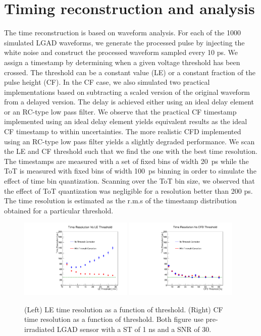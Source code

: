 \documentclass[preprint,1p]{elsarticle}
\begin{document}
\section{Timing reconstruction and analysis}\label{sec:timing_and_analysis}
The time reconstruction is based on waveform analysis. For each of the 1000 simulated LGAD waveforms,
we generate the processed pulse by injecting the white noise and construct the processed waveform
sampled every 10 ps. We assign a timestamp by determining when a given voltage threshold has been crossed.
The threshold can be a constant value (LE) or a constant fraction of the pulse height (CF).
In the CF case, we also simulated two practical implementations based on subtracting
a scaled version of the original waveform from a delayed version. The delay is achieved either using an ideal
delay element or an RC-type low pass filter. We observe that the practical CF timestamp implemented
using an ideal delay element yields equivalent results as the ideal CF timestamp to within uncertainties.
The more realistic CFD implemented using an RC-type low pass filter yields a slightly degraded performance.
We scan the LE and CF threshold such that we find the one with the best time resolution.
The timestamps are measured with a set of fixed bins of width 20~\si{ps} while the ToT is measured with fixed bins of width 100~\si{ps} binning in order to simulate the effect of time bin quantization. Scanning over the ToT bin size, we observed that the effect of ToT quantization was negligible for a resolution better than 200 ps.
The time resolution is estimated as the r.m.s of the timestamp distribution obtained for a particular threshold.

  \begin{figure}[htbp]
    \centering
    \includegraphics[width=0.48\textwidth]{figs/ShapingTime1p0_SNR30_55MicronGain15Prerad_FIXED_NOISE_FIXED_SNR_V2_converted_TimeResolutionVsThresholdToT.pdf} \hfill
    \includegraphics[width=0.48\textwidth]{figs/ShapingTime1p0_SNR30_55MicronGain15Prerad_FIXED_NOISE_FIXED_SNR_V2_converted_TimeResolutionVsThresholdCFD.pdf}
    \caption{(Left) LE time resolution as a function of threshold.
    (Right) CF time resolution as a function of threshold.
    Both figure use pre-irradiated LGAD sensor with a ST of 1 ns and a SNR of 30.}
    \label{fig:time_resolution_scan}
  \end{figure}
\end{document}
